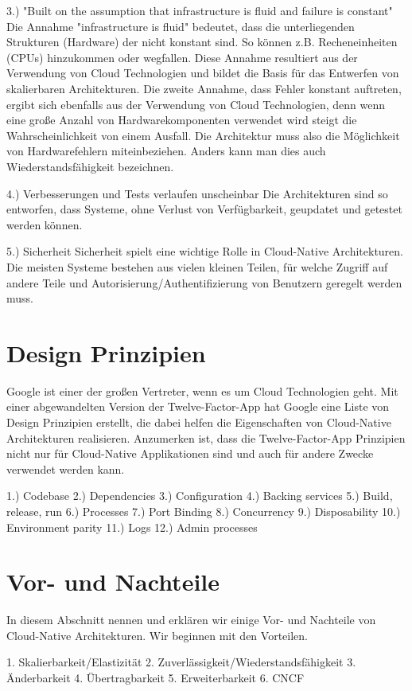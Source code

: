 3.) "Built on the assumption that infrastructure is fluid and failure is constant"
Die Annahme "infrastructure is fluid" bedeutet, dass die unterliegenden Strukturen (Hardware) der nicht konstant sind. So können z.B. Recheneinheiten (CPUs) hinzukommen oder wegfallen. Diese Annahme resultiert aus der Verwendung von Cloud Technologien und bildet die Basis für das Entwerfen von skalierbaren Architekturen.
Die zweite Annahme, dass Fehler konstant auftreten, ergibt sich ebenfalls aus der Verwendung von Cloud Technologien, denn wenn eine große Anzahl von Hardwarekomponenten verwendet wird steigt die Wahrscheinlichkeit von einem Ausfall. Die Architektur muss also die Möglichkeit von Hardwarefehlern miteinbeziehen. Anders kann man dies auch Wiederstandsfähigkeit bezeichnen.

4.) Verbesserungen und Tests verlaufen unscheinbar
Die Architekturen sind so entworfen, dass Systeme, ohne Verlust von Verfügbarkeit, geupdatet und getestet werden können.

5.) Sicherheit
Sicherheit spielt eine wichtige Rolle in Cloud-Native Architekturen. Die meisten Systeme bestehen  aus vielen kleinen Teilen, für welche Zugriff auf andere Teile und Autorisierung/Authentifizierung von Benutzern geregelt werden muss.

\section{Design Prinzipien}
Google ist einer der großen Vertreter, wenn es um Cloud Technologien geht. Mit einer abgewandelten Version der Twelve-Factor-App hat Google eine Liste von Design Prinzipien erstellt, die dabei helfen die Eigenschaften von Cloud-Native Architekturen realisieren. Anzumerken ist, dass die Twelve-Factor-App Prinzipien nicht nur für Cloud-Native Applikationen sind und auch für andere Zwecke verwendet werden kann.

1.) Codebase
2.) Dependencies
3.) Configuration
4.) Backing services
5.) Build, release, run
6.) Processes
7.) Port Binding
8.) Concurrency
9.) Disposability
10.) Environment parity
11.) Logs
12.) Admin processes

\section{Vor- und Nachteile}
In diesem Abschnitt nennen und erklären wir einige Vor- und Nachteile von Cloud-Native Architekturen. Wir beginnen mit den Vorteilen.

1. Skalierbarkeit/Elastizität
2. Zuverlässigkeit/Wiederstandsfähigkeit
3. Änderbarkeit
4. Übertragbarkeit
5. Erweiterbarkeit
6. CNCF

